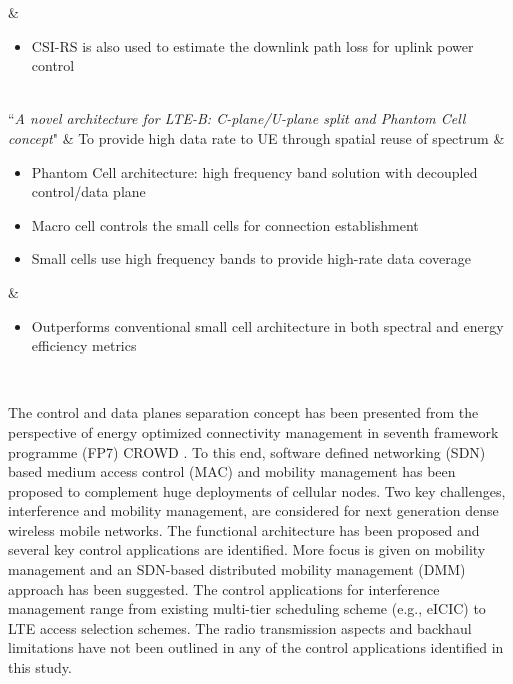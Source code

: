 \documentclass[article,10pt,twocolumn]{IEEEtran}
\begin{document}
\begin{table*}[!htb]
\begin{tcolorbox}[tab1,tabularx={>{\raggedright\arraybackslash}p{1.1in}||>{\raggedright\arraybackslash}p{1in}|X|>{\raggedright\arraybackslash}p{1.45in}}]
																																& \compress\begin{itemize}[leftmargin=0.75em]
																																	\item CSI-RS is also used to estimate the downlink path loss for uplink power control
																																	\vspace*{-\baselineskip}
																																\end{itemize}						\\ \hline
``\textit{A novel architecture for LTE-B: C-plane/U-plane split and Phantom Cell concept}" \citep{6477646,6554746}
					& To provide high data rate to UE through spatial reuse of spectrum
												&\compress\begin{itemize}[leftmargin=1.25em]
													\renewcommand{\labelitemi}{$\Rightarrow$}
													\item Phantom Cell architecture: high frequency band solution with decoupled control/data plane
													\item Macro cell controls the small cells for connection establishment 
													\item Small cells use high frequency bands to provide high-rate data coverage
													\vspace*{-\baselineskip}
												\end{itemize}														
																																& \compress\begin{itemize}[leftmargin=0.75em]
																																	\item Outperforms conventional small cell architecture in both spectral and energy efficiency metrics
																																	\vspace*{-\baselineskip}
																																\end{itemize}						\\  \hline\hline
\end{tcolorbox}
\vspace{-4mm}
\end{table*}

The control and data planes separation concept has been presented from the perspective of energy optimized connectivity management in seventh framework programme (FP7) CROWD \citep{6702534}. To this end, software defined networking (SDN) based medium access control (MAC) and mobility management has been proposed to complement huge deployments of cellular nodes. Two key challenges, interference and mobility management, are considered for next generation dense wireless mobile networks. The functional architecture has been proposed and several key control applications are identified. More focus is given on mobility management and an SDN-based distributed mobility management (DMM) approach has been suggested. The control applications for interference management range from existing multi-tier scheduling scheme (e.g., eICIC) to LTE access selection schemes. The radio transmission aspects and backhaul limitations have not been outlined in any of the control applications identified in this study.
\end{document}
